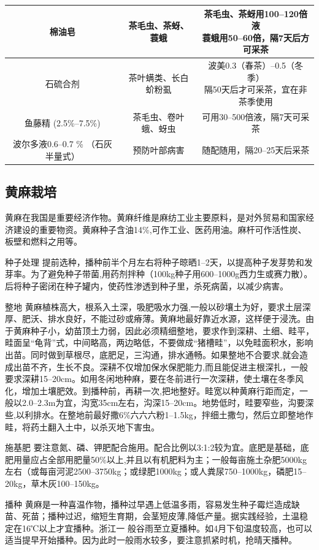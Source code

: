\documentclass{ctexbook}
\begin{document}
\begin{table}[htbp]
\begin{tabular}{c|c|c}
		\hline
		棉油皂   & 茶毛虫、茶蚜、蓑蛾 & \thead{茶毛虫、茶蚜用100--120倍液\\蓑蛾用50--60倍，隔7天后方可采茶} \\
		\hline
		石硫合剂  & 茶叶螨类、长白蚧粉虱 & \thead{波美0.3（春茶）--0.5（冬季）\\隔50天后才可采茶，宜在非茶季使用} \\
		\hline
		鱼藤精 (2.5\%--7.5\%) & 茶毛虫、卷叶蛾、蚜虫 & 可用30--500倍液，隔7天可采茶 \\
		\hline
		波尔多液0.6--0.7 \% （石灰半量式） & 预防叶部病害 & 随配随用，隔20--25天后采茶 \\
		\hline
	\end{tabular}%
	\label{tab:chayuannongyao}%
\end{table}%
\subsection{黄麻栽培}
黄麻在我国是重要经济作物。黄麻纤维是麻纺工业主要原料，是对外贸易和国家经济建设的重要物资。黄麻种子含油14\%,可作工业、医药用油。麻杆可作活性炭、板壁和燃料之用等。

种子处理 提前选种，播种前半个月左右将种子晾晒1--2天，以提高种子发芽势和发芽率。为了避免种子带菌,用药剂拌种（100kg种子用600--1000g西力生或赛力散）。后将种子密闭在种子罐内，使药性渗透到种子里，杀死病菌，以减少病害。

整地 黄麻植株高大，根系入土深，吸肥吸水力强,一般以砂壤土为好，要求土层深厚、肥沃、排水良好，不能过砂或瘠薄。黄麻地最好靠近水源，这样便于浸洗。由于黄麻种子小，幼苗顶土力弱，因此必须精细整地，要求作到深耕、土细、畦平，畦面呈“龟背”式，中间略高，两边略低，不要做成“猪槽畦”，以免畦面积水，影响出苗。同时做到草根尽，底肥足，三沟通，排水通畅。如果整地不合要求,就会造成出苗不齐，生长不良。深耕不仅增加保水保肥能力,而且能促进主根深扎，一般要求深耕15--20cm。如用冬闲地种麻，要在冬前进行一次深耕，使土壤在冬季风化，增加土壤肥效。到播种前，再耕一次,把地整好。畦宽以种黄麻行距而定，一般以2.0--2.3m为宜，沟宽35cm左右，沟深15--20cm。地势低时，畦要窄些，沟要深些,以利排水。在整地前最好撒6\%六六六粉1--1.5kg，拌细土撒匀，然后立即整地作畦，将药土翻入土中，以杀灭地下害虫。

施基肥 要注意氮、磷、钾肥配合施用。配合比例以3:1:2较为宜。底肥是基础，底肥用量应占全部用肥量50\%以上,并且以有机肥料为主；一般每亩施土杂肥5000kg左右（或每亩河泥2500--3750kg；或绿肥1000kg；或人粪尿750--1000kg，磷肥15--20kg，草木灰100--150kg。

播种 黄麻是一种喜温作物，播种过早遇上低温多雨，容易发生种子霉烂造成缺苗、死苗；播种过迟，缩短生育期，会茎短皮薄,降低产量。据实践经验，土温稳定在16℃以上才宜播种。浙江一
般谷雨至立夏播种。如4月下旬温度较高，也可以适当提早开始播种。因为此时一般雨水较多，要注意抓紧时机，抢晴天播种。
\end{document}
